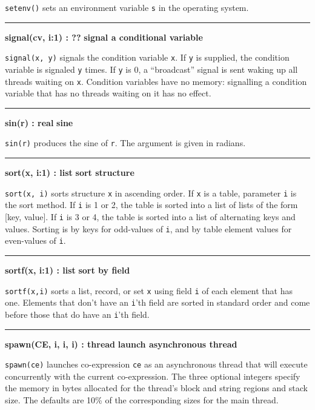 \noindent
{}\texttt{setenv()} sets an environment variable
\texttt{s} in the operating system.

\bigskip\hrule\vspace{0.1cm}
\noindent
{\bf signal(cv, i:1) : ?? } \hfill {\bf signal a conditional variable}

\noindent
{}\texttt{signal(x, y)} signals the condition variable
\texttt{x}. If \texttt{y} is supplied, the condition variable is
signaled \texttt{y} times. If \texttt{y} is 0, a ``broadcast''
signal is sent waking up all threads waiting on \texttt{x}.
Condition variables have no memory: signalling a condition variable
that has no threads waiting on it has no effect.

\bigskip\hrule\vspace{0.1cm}
\noindent
{\bf sin(r) : real } \hfill {\bf sine}

\noindent
{}\texttt{sin(r)} produces the sine of
\texttt{r}. The argument is given in radians.

\bigskip\hrule\vspace{0.1cm}
\noindent
{\bf sort(x, i:1) : list } \hfill {\bf sort structure}

\noindent
{}\texttt{sort(x, i)} sorts structure \texttt{x} in
ascending order. If
\texttt{x} is a table, parameter \texttt{i} is the sort method. If
\texttt{i} is 1 or 2, the table is sorted into a list of lists of the
form [key, value]. If \texttt{i} is 3 or 4, the table is sorted into a
list of alternating keys and values. Sorting is by keys for odd-values
of \texttt{i}, and by table element values for even-values of
\texttt{i}.

\bigskip\hrule\vspace{0.1cm}
\noindent
{\bf sortf(x, i:1) : list } \hfill {\bf sort by field}

\noindent
{}\texttt{sortf(x,i)} sorts a list, record, or set
\texttt{x} using field \texttt{i} of each element that has one.
Elements that don't have an
\texttt{i}'th field are sorted in standard order and
come before those that do have an \texttt{i}'th field.

\bigskip\hrule\vspace{0.1cm}
\noindent
{\bf spawn(CE, i, i, i) : thread } \hfill {\bf launch asynchronous thread}

\noindent
{}\texttt{spawn(ce)} launches co-expression \texttt{ce} as an
asynchronous thread that will execute concurrently with the current
co-expression. The three optional integers specify the memory in bytes
allocated for the thread's block and string regions and stack size.
The defaults are 10\% of the corresponding sizes for the main thread.

